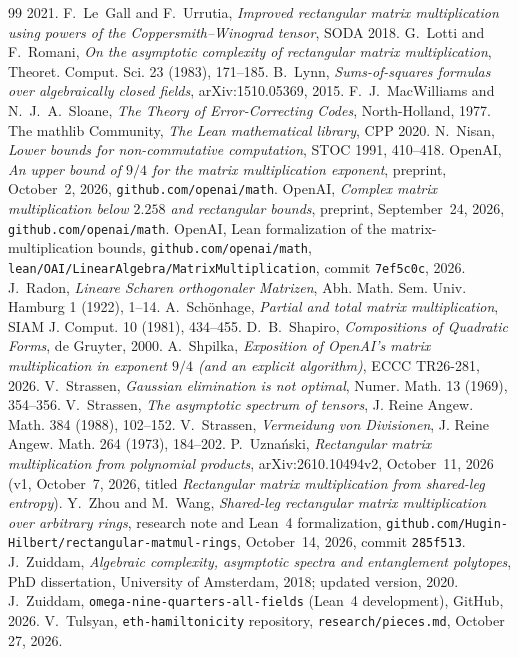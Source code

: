 \documentclass[11pt]{article}
\theoremstyle{definition}
\theoremstyle{remark}
\begin{document}
\begin{thebibliography}{99}
2021.
 F.~Le~Gall and F.~Urrutia, \emph{Improved rectangular matrix multiplication using
powers of the Coppersmith--Winograd tensor}, SODA 2018.
 G.~Lotti and F.~Romani, \emph{On the asymptotic complexity of rectangular matrix
multiplication}, Theoret. Comput. Sci. 23 (1983), 171--185.
 B.~Lynn, \emph{Sums-of-squares formulas over algebraically closed fields},
arXiv:1510.05369, 2015.
 F.~J.~MacWilliams and N.~J.~A.~Sloane, \emph{The Theory of Error-Correcting
Codes}, North-Holland, 1977.
 The mathlib Community, \emph{The Lean mathematical library}, CPP 2020.
 N.~Nisan, \emph{Lower bounds for non-commutative computation}, STOC 1991, 410--418.
 OpenAI, \emph{An upper bound of $9/4$ for the matrix multiplication exponent}, preprint,
October~2, 2026, \texttt{github.com/openai/math}.
 OpenAI, \emph{Complex matrix multiplication below $2.258$ and rectangular bounds}, preprint,
September~24, 2026, \texttt{github.com/openai/math}.
 OpenAI, Lean formalization of the matrix-multiplication bounds,
\texttt{github.com/openai/math}, \texttt{lean/OAI/LinearAlgebra/MatrixMultiplication}, commit \texttt{7ef5c0c},
2026.
 J.~Radon, \emph{Lineare Scharen orthogonaler Matrizen}, Abh. Math. Sem. Univ. Hamburg 1
(1922), 1--14.
 A.~Sch\"onhage, \emph{Partial and total matrix multiplication}, SIAM J. Comput. 10 (1981),
434--455.
 D.~B.~Shapiro, \emph{Compositions of Quadratic Forms}, de Gruyter, 2000.
 A.~Shpilka, \emph{Exposition of OpenAI's matrix multiplication in exponent $9/4$ (and an
explicit algorithm)}, ECCC TR26-281, 2026.
 V.~Strassen, \emph{Gaussian elimination is not optimal}, Numer. Math. 13 (1969), 354--356.
 V.~Strassen, \emph{The asymptotic spectrum of tensors}, J. Reine Angew. Math. 384
(1988), 102--152.
 V.~Strassen, \emph{Vermeidung von Divisionen}, J. Reine Angew. Math. 264 (1973), 184--202.
 P.~Uzna\'nski, \emph{Rectangular matrix multiplication from polynomial products},
arXiv:2610.10494v2, October~11, 2026 (v1, October~7, 2026, titled \emph{Rectangular matrix multiplication from
shared-leg entropy}).
 Y.~Zhou and M.~Wang, \emph{Shared-leg rectangular matrix multiplication over arbitrary
rings}, research note and Lean~4 formalization, \texttt{github.com/Hugin-Hilbert/rectangular-matmul-rings},
October~14, 2026, commit \texttt{285f513}.
 J.~Zuiddam, \emph{Algebraic complexity, asymptotic spectra and entanglement polytopes},
PhD dissertation, University of Amsterdam, 2018; updated version, 2020.
 J.~Zuiddam, \texttt{omega-nine-quarters-all-fields} (Lean~4 development), GitHub, 2026.
 V.~Tulsyan, \texttt{eth-hamiltonicity} repository, \texttt{research/pieces.md}, October 27,
2026.
\end{thebibliography}
\end{document}

